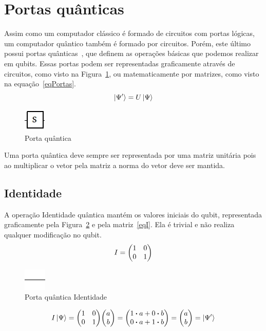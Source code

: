 \documentclass[a4paper, 12pt, oneside]{book}
\begin{document}
\section{Portas quânticas}
Assim como um computador clássico é formado de circuitos com portas lógicas, um computador quântico também é formado por circuitos. Porém, este último possui portas quânticas~\cite{nielsen}, que definem as operações básicas que podemos realizar em qubits. Essas portas podem ser representadas graficamente através de circuitos, como visto na Figura~\ref{fig:portaQuantica}, ou matematicamente por matrizes, como visto na equação~\eqref{eqPortas}.
\begin{equation}\label{eqPortas}
\ket{\Psi'} =  U\ket{\Psi}
\end{equation}

\begin{figure}[H]
\centering
\includegraphics[scale=0.75]{s.jpg}
\caption{Porta quântica}
\label{fig:portaQuantica}
\end{figure}

Uma porta quântica deve sempre ser representada por uma matriz unitária pois ao multiplicar o vetor pela matriz a norma do vetor deve ser mantida.

\subsection{Identidade} \label{sec:identidade}
A operação Identidade quântica mantém os valores iniciais do qubit, representada graficamente pela Figura~\ref{fig:I} e pela matriz~\eqref{eqI}. Ela é trivial e não realiza qualquer modificação no qubit.
\begin{equation}\label{eqI}
I =  \mqty(1&0\\0&1)
\end{equation}

\begin{figure}[H]
\centering
\includegraphics[scale=0.75]{line.jpg}
\caption{Porta quântica Identidade}
\label{fig:I}
\end{figure}

\begin{align*}
I\ket{\Psi} = \mqty(1&0\\0&1)\mqty(a\\b) = \mqty(1 \vdot a+0 \vdot b \\0 \vdot a+1 \vdot b) = \mqty(a\\b) = \ket{\Psi'}
\end{align*}
\end{document}
